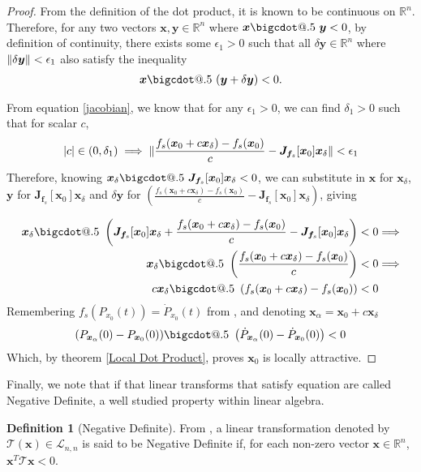 \documentclass{article}
\makeatletter
\newcommand{\B}[1]{\boldsymbol{#1}}
\newcommand*\bigcdot{\mathpalette\bigcdot@{.5}}
\newcommand*\bigcdot@[2]{\mathbin{\vcenter{\hbox{\scalebox{#2}{$\m@th#1\bullet$}}}}}
\DeclarePairedDelimiter\abs{\lvert}{\rvert}%
\DeclarePairedDelimiter\norm{\lVert}{\rVert}%
\theoremstyle{definition}
\newtheorem{definition}{Definition}[section]
\theoremstyle{remark}
\makeatother
\begin{document}
\begin{proof}
  From the definition of the dot product, it is known to be continuous on $\mathbb{R}^n$.
  Therefore, for any two vectors $\B{x}, \B{y} \in \mathbb{R}^n$ where $\B{x} \bigcdot~ \B{y} < 0$, 
  by definition of continuity, 
  there exists some $\epsilon_1 > 0$ such that all $\delta\B{y} \in \mathbb{R}^n$ where
  $\norm{\delta\B{y}} < \epsilon_1$ also satisfy the inequality
  \begin{align}
     \B{x}  \bigcdot~ (\B{y} + \delta\B{y}) < 0.  \label{eq:1}
  \end{align}

  
  From equation \ref{jacobian}, we know that for any $\epsilon_1 > 0$, we can find $\delta_1 > 0$
  such that for scalar $c$,
  \begin{align}
    \abs{c} \in (0, \delta_1) \implies \norm{\frac{f_s(\B{x}_0 + c \B{x}_\delta) - f_s(\B{x}_0)}{c} - \B{J}_{\B{f}_s}[\B{x}_0] \B{x}_\delta} < \epsilon_1 
  \end{align}
  Therefore, knowing $\B{x}_\delta \bigcdot~ \B{J}_{\B{f}_s}[\B{x}_0] \B{x}_\delta < 0$,
  we can substitute in  $\B{x}$ for $\B{x}_\delta$, $\B{y}$ for $\B{J}_{\B{f}_s}[\B{x}_0] \B{x}_\delta$
  and $\delta\B{y}$ for $(\frac{f_s(\B{x}_0 + c \B{x}_\delta) - f_s(\B{x}_0)}{c} - \B{J}_{\B{f}_s}[\B{x}_0] \B{x}_\delta)$, giving

  \begin{align}
    \B{x}_\delta \bigcdot~ \left(\B{J}_{\B{f}_s}[\B{x}_0] \B{x}_\delta + \frac{f_s(\B{x}_0 + c \B{x}_\delta) - f_s(\B{x}_0)}{c} - \B{J}_{\B{f}_s}[\B{x}_0] \B{x}_\delta \right) &< 0 \Longrightarrow \nonumber\\
    \B{x}_\delta \bigcdot~ \left(\frac{f_s(\B{x}_0 + c \B{x}_\delta) - f_s(\B{x}_0)}{c} \right) &< 0 \Longrightarrow \nonumber \\
    c \B{x}_\delta \bigcdot~ \left({f_s(\B{x}_0 + c \B{x}_\delta) - f_s(\B{x}_0)} \right) &< 0
  \end{align}
  Remembering $f_s(P_{x_0}(t)) = \dot{P}_{x_0}(t)$ from , and denoting $\B{x}_\alpha = \B{x}_0 + c \B{x}_\delta$ 
  \begin{align}
    (P_{\B{x}_\alpha}(0) - P_{\B{x}_0}(0)) \bigcdot~ \left(\dot{P}_{\B{x}_\alpha}(0) - \dot{P}_{\B{x}_0}(0)\right) < 0
  \end{align}
  Which, by theorem \ref{Local Dot Product}, proves $\B{x}_0$ is locally attractive.
\end{proof}

Finally, we note that if that linear transforms that satisfy equation  are called
Negative Definite, a well studied property within linear algebra.
\begin{definition}[Negative Definite]
  \label{Negative Definite}
  From \cite{LinearAlgebra}, a linear transformation denoted by
  $\mathscr{T}(\B{x}) \in \mathcal{L}_{n,n}$ is said to be Negative Definite
  if, for each non-zero vector $\B{x} \in \mathbb{R}^n$, $\B{x}^T \mathscr{T}\B{x} < 0$.
\end{definition}
\end{document}
